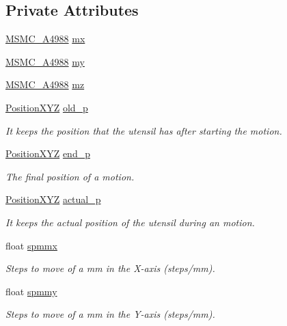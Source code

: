 \subsection*{Private Attributes}
\begin{DoxyCompactItemize}
\item 
\hyperlink{class_m_s_m_c___a4988}{M\+S\+M\+C\+\_\+\+A4988} \hyperlink{class_c_n_c___router_aa6009653314607491aa277b1f3c9bf85}{mx}
\item 
\hyperlink{class_m_s_m_c___a4988}{M\+S\+M\+C\+\_\+\+A4988} \hyperlink{class_c_n_c___router_ac3fb4521615d90ff7baa6bdb287d97c9}{my}
\item 
\hyperlink{class_m_s_m_c___a4988}{M\+S\+M\+C\+\_\+\+A4988} \hyperlink{class_c_n_c___router_add549ccc206f5feff41f9e818e370ef8}{mz}
\item 
\hyperlink{class_position_x_y_z}{Position\+X\+Y\+Z} \hyperlink{class_c_n_c___router_afd338336ec37545574369a5f71ff310b}{old\+\_\+p}
\begin{DoxyCompactList}\small\item\em It keeps the position that the utensil has after starting the motion. \end{DoxyCompactList}\item 
\hyperlink{class_position_x_y_z}{Position\+X\+Y\+Z} \hyperlink{class_c_n_c___router_a025944e9009cd9b63b6105c41f4665c3}{end\+\_\+p}
\begin{DoxyCompactList}\small\item\em The final position of a motion. \end{DoxyCompactList}\item 
\hyperlink{class_position_x_y_z}{Position\+X\+Y\+Z} \hyperlink{class_c_n_c___router_a5e1d4c6b520762621889824c192e13fb}{actual\+\_\+p}
\begin{DoxyCompactList}\small\item\em It keeps the actual position of the utensil during an motion. \end{DoxyCompactList}\item 
float \hyperlink{class_c_n_c___router_ad8830a7b387905027b8a1a9e3b31e3c7}{spmmx}
\begin{DoxyCompactList}\small\item\em Steps to move of a mm in the X-\/axis (steps/mm). \end{DoxyCompactList}\item 
float \hyperlink{class_c_n_c___router_ab44dd3a48e5c03f3484cd223cb8f9444}{spmmy}
\begin{DoxyCompactList}\small\item\em Steps to move of a mm in the Y-\/axis (steps/mm). \end{DoxyCompactList}\item 

\end{DoxyCompactItemize}
